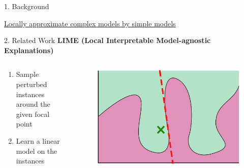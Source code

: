 \documentclass[unicode]{beamer}
\begin{document}
\begin{frame}
\begin{columns}[t]
\begin{column}{\lcol\linewidth}
\begin{block}{1. Background}
\begin{center}
          \underline{Locally approximate complex models by simple models}
        \end{center}
      \end{block}
      \vspace{-0.6em}
      \begin{block}{2. Related Work}
        \hspace{-1.0em}
        \textbf{LIME \small(Local Interpretable Model-agnostic Explanations)}\cite{ribeiro2016why}
        \vspace{-0.6em}
        \begin{columns}
          \begin{column}{.55\textwidth}
            {
              \renewcommand{\leftmargini}{2.5em}
              \begin{enumerate}
                \item Sample perturbed instances around the given focal point
                \item Learn a linear model on the instances
              \end{enumerate}
            }
          \end{column}
          \begin{column}{.45\textwidth}
            \begin{figure}
              \centering
              \includegraphics[width=.8\textwidth]{src/img/visual-lime}
            \end{figure}
          \end{column}
        \end{columns}


\end{block}
\end{column}
\end{columns}
\end{frame}
\end{document}

